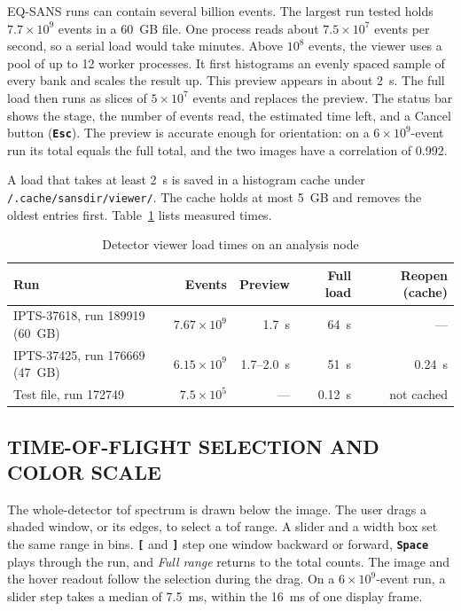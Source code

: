 \documentclass[tm]{ornltm}
\newcommand{\key}[1]{\textbf{\texttt{#1}}}
\newcommand{\hme}{\raisebox{0.4ex}{\texttildelow}}
\begin{document}
EQ-SANS runs can contain several billion events. The largest run tested holds
$7.7\times10^{9}$ events in a 60~GB file. One process reads about
$7.5\times10^{7}$ events per second, so a serial load would take minutes. Above
$10^{8}$ events, the viewer uses a pool of up to 12 worker processes. It first
histograms an evenly spaced sample of every bank and scales the result up. This
preview appears in about 2~s. The full load then runs as slices of
$5\times10^{7}$ events and replaces the preview. The status bar shows the stage,
the number of events read, the estimated time left, and a Cancel button
(\key{Esc}). The preview is accurate enough for orientation: on a
$6\times10^{9}$-event run its total equals the full total, and the two images
have a correlation of 0.992.

A load that takes at least 2~s is saved in a histogram cache under
\texttt{\hme/.cache/sansdir/viewer/}. The cache holds at most 5~GB and removes
the oldest entries first. Table~\ref{tab:viewerperf} lists measured times.

\begin{table}[ht]
  \centering
  \caption{Detector viewer load times on an analysis node}
  \label{tab:viewerperf}
  \small
  \begin{tabular}{l r r r r}
    \toprule
    Run & Events & Preview & Full load & Reopen (cache) \\
    \midrule
    IPTS-37618, run 189919 (60~GB) & $7.67\times10^{9}$ & 1.7~s & 64~s & --- \\
    IPTS-37425, run 176669 (47~GB) & $6.15\times10^{9}$ & 1.7--2.0~s & 51~s & 0.24~s \\
    Test file, run 172749 & $7.5\times10^{5}$ & --- & 0.12~s & not cached \\
    \bottomrule
  \end{tabular}
\end{table}

\subsection{TIME-OF-FLIGHT SELECTION AND COLOR SCALE}

The whole-detector \ac{tof} spectrum is drawn below the image. The user drags a
shaded window, or its edges, to select a \ac{tof} range. A slider and a width
box set the same range in bins. \key{[} and \key{]} step one window backward or
forward, \key{Space} plays through the run, and \emph{Full range} returns to the
total counts. The image and the hover readout follow the selection during the
drag. On a $6\times10^{9}$-event run, a slider step takes a median of 7.5~ms,
within the 16~ms of one display frame.
\end{document}
